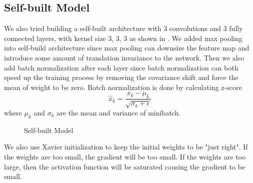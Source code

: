 \documentclass{article} %
\begin{document}
 \subsection{Self-built Model}
 We also tried building a self-built architecture with 3 convolutions and 3 fully connected layers, 
 with kernel size 3, 3, 3 as shown in . We added max pooling into self-build architecture since max pooling can 
 downsize the feature map and introduce some amount of translation invariance to the network. 
 Then we also add batch normalization after each layer since batch normalization can both speed up
 the training process by removing the covariance shift and force the mean of weight to be zero.
 Batch normalization is done by calculating z-score 
 \begin{equation}
     \hat{x}_k = \frac{x_k-\mu_k}{\sqrt{\sigma_k+\epsilon}}
 \end{equation} where $\mu_k$ and $\sigma_k$ are the mean and variance of minibatch.\
 \begin{figure}[h]
    \centering
    \qquad
    \caption{Self-built Model}
    \label{fig:self}
\end{figure}
 We also use Xavier initialization to keep the initial weights to be "just right". If the weights are 
 too small, the gradient will be too small. If the weights are too large, then the activation function 
 will be saturated causing the gradient to be small. \
 
\end{document}
